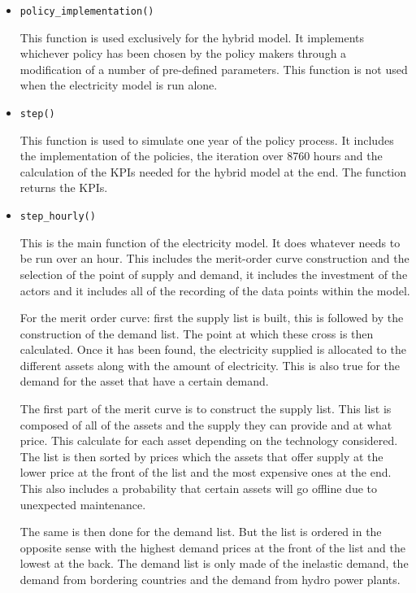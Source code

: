 \begin{itemize}
\item \texttt{policy\_implementation()}

This function is used exclusively for the hybrid model. It implements whichever policy has been chosen by the policy makers through a modification of a number of pre-defined parameters. This function is not used when the electricity model is run alone.

\item \texttt{step()}

This function is used to simulate one year of the policy process. It includes the implementation of the policies, the iteration over 8760 hours and the calculation of the KPIs needed for the hybrid model at the end. The function returns the KPIs.

\item \texttt{step\_hourly()}

This is the main function of the electricity model. It does whatever needs to be run over an hour. This includes the merit-order curve construction and the selection of the point of supply and demand, it includes the investment of the actors and it includes all of the recording of the data points within the model.

For the merit order curve: first the supply list is built, this is followed by the construction of the demand list. The point at which these cross is then calculated. Once it has been found, the electricity supplied is allocated to the different assets along with the amount of electricity. This is also true for the demand for the asset that have a certain demand.

The first part of the merit curve is to construct the supply list. This list is composed of all of the assets and the supply they can provide and at what price. This calculate for each asset depending on the technology considered. The list is then sorted by prices which the assets that offer supply at the lower price at the front of the list and the most expensive ones at the end. This also includes a probability that certain assets will go offline due to unexpected maintenance.

The same is then done for the demand list. But the list is ordered in the opposite sense with the highest demand prices at the front of the list and the lowest at the back. The demand list is only made of the inelastic demand, the demand from bordering countries and the demand from hydro power plants.


\end{itemize}
